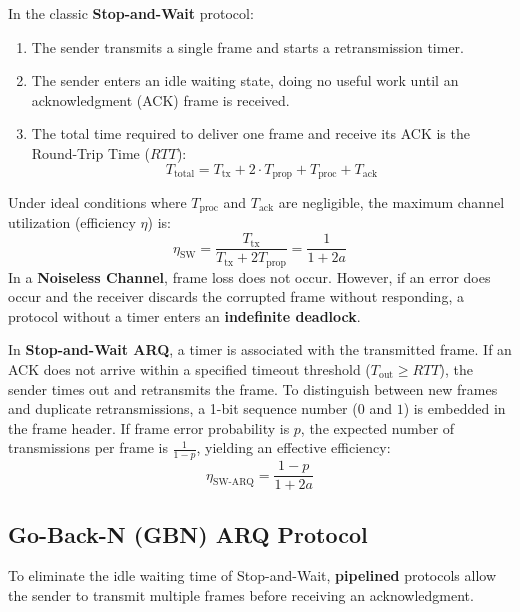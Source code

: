 \documentclass[11pt,a4paper]{article}
\begin{document}
In the classic \textbf{Stop-and-Wait} protocol:
\begin{enumerate}
    \item The sender transmits a single frame and starts a retransmission timer.
    \item The sender enters an idle waiting state, doing no useful work until an acknowledgment (ACK) frame is received.
    \item The total time required to deliver one frame and receive its ACK is the Round-Trip Time (\(RTT\)):
    \begin{equation}
        T_{\text{total}} = T_{\text{tx}} + 2 \cdot T_{\text{prop}} + T_{\text{proc}} + T_{\text{ack}}
    \end{equation}
\end{enumerate}
Under ideal conditions where \(T_{\text{proc}}\) and \(T_{\text{ack}}\) are negligible, the maximum channel utilization (efficiency \(\eta\)) is:
\begin{equation}
    \eta_{\text{SW}} = \frac{T_{\text{tx}}}{T_{\text{tx}} + 2 T_{\text{prop}}} = \frac{1}{1 + 2a}
\end{equation}
In a \textbf{Noiseless Channel}, frame loss does not occur. However, if an error does occur and the receiver discards the corrupted frame without responding, a protocol without a timer enters an \textbf{indefinite deadlock}.

In \textbf{Stop-and-Wait ARQ}, a timer is associated with the transmitted frame. If an ACK does not arrive within a specified timeout threshold (\(T_{\text{out}} \ge RTT\)), the sender times out and retransmits the frame. To distinguish between new frames and duplicate retransmissions, a 1-bit sequence number (\(0\) and \(1\)) is embedded in the frame header. If frame error probability is \(p\), the expected number of transmissions per frame is \(\frac{1}{1 - p}\), yielding an effective efficiency:
\begin{equation}
    \eta_{\text{SW-ARQ}} = \frac{1 - p}{1 + 2a}
\end{equation}

\subsection{Go-Back-N (GBN) ARQ Protocol}

To eliminate the idle waiting time of Stop-and-Wait, \textbf{pipelined} protocols allow the sender to transmit multiple frames before receiving an acknowledgment.
\end{document}
